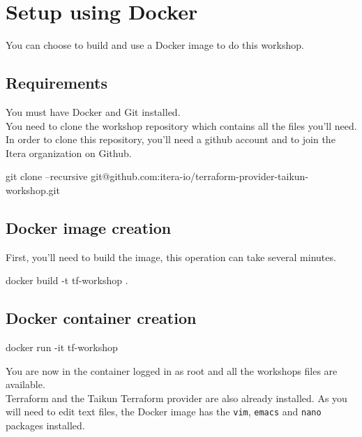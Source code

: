 \section{Setup using Docker}\label{sec:docker}

You can choose to build and use a Docker image to do this workshop.

\subsection{Requirements}

You must have Docker and Git installed.\\
You need to clone the workshop repository which contains all the files you'll need.\\
In order to clone this repository, you'll need a github account and to join the Itera organization on Github.

\begin{shell}
git clone --recursive git@github.com:itera-io/terraform-provider-taikun-workshop.git
\end{shell}

\subsection{Docker image creation}

First, you'll need to build the image, this operation can take several minutes.

\begin{shell}
docker build -t tf-workshop .
\end{shell}

\subsection{Docker container creation}

\begin{shell}
docker run -it tf-workshop
\end{shell}
You are now in the container logged in as root and all the workshops files are available.\\
Terraform and the Taikun Terraform provider are also already installed.
As you will need to edit text files, the Docker image has the \texttt{vim}, \texttt{emacs} and \texttt{nano}
packages installed.
